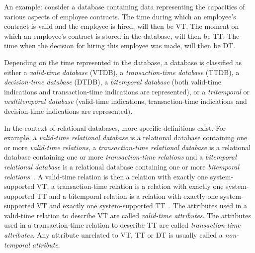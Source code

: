 An example: consider a database containing data representing the capacities of various aspects of employee contracts. The time during which an employee's contract is valid and the employee is hired, will then be VT. The moment on which an employee's contract is stored in the database, will then be TT. The time when the decision for hiring this employee was made, will then be DT.

Depending on the time represented in the database, a database is classified as either a \emph{valid-time database} (VTDB), a \emph{transaction-time database} (TTDB), a \emph{decision-time database} (DTDB), a \emph{bitemporal database} (both valid-time indications and transaction-time indications are represented), or a \emph{tritemporal} or \emph{multitemporal database} (valid-time indications, transaction-time indications and decision-time indications are represented).

In the context of relational databases, more specific definitions exist. For example, a \emph{valid-time relational database} is a relational database containing one or more \emph{valid-time relations}, a \emph{transaction-time relational database} is a relational database containing one or more \emph{transaction-time relations} and a \emph{bitemporal relational database} is a relational database containing one or more \emph{bitemporal relations}~\cite{Dyreson1994}. A valid-time relation is then a relation with exactly one system-supported VT, a transaction-time relation is a relation with exactly one system-supported TT and a bitemporal relation is a relation with exactly one system-supported VT and exactly one system-supported TT~\cite{Dyreson1994}. The attributes used in a valid-time relation to describe VT are called \emph{valid-time attributes}. The attributes used in a transaction-time relation to describe TT are called \emph{transaction-time attributes}. Any attribute unrelated to VT, TT or DT is usually called a \emph{non-temporal attribute}.


